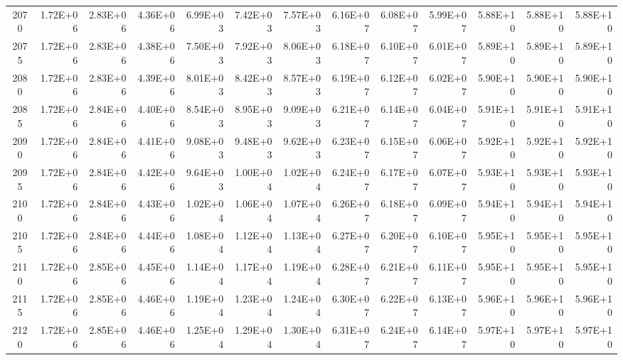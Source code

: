 \documentclass{article}
\begin{document}
\begin{table}
\begin{tabular}{crrr|rrr|rrr|rrr}
2070     & 1.72E+06   & 2.83E+06   & 4.36E+06   & 6.99E+03   & 7.42E+03   & 7.57E+03   & 6.16E+07   & 6.08E+07   & 5.99E+07   & 5.88E+10   & 5.88E+10   & 5.88E+10   \\
2075     & 1.72E+06   & 2.83E+06   & 4.38E+06   & 7.50E+03   & 7.92E+03   & 8.06E+03   & 6.18E+07   & 6.10E+07   & 6.01E+07   & 5.89E+10   & 5.89E+10   & 5.89E+10   \\
2080     & 1.72E+06   & 2.83E+06   & 4.39E+06   & 8.01E+03   & 8.42E+03   & 8.57E+03   & 6.19E+07   & 6.12E+07   & 6.02E+07   & 5.90E+10   & 5.90E+10   & 5.90E+10   \\
2085     & 1.72E+06   & 2.84E+06   & 4.40E+06   & 8.54E+03   & 8.95E+03   & 9.09E+03   & 6.21E+07   & 6.14E+07   & 6.04E+07   & 5.91E+10   & 5.91E+10   & 5.91E+10   \\
2090     & 1.72E+06   & 2.84E+06   & 4.41E+06   & 9.08E+03   & 9.48E+03   & 9.62E+03   & 6.23E+07   & 6.15E+07   & 6.06E+07   & 5.92E+10   & 5.92E+10   & 5.92E+10   \\
2095     & 1.72E+06   & 2.84E+06   & 4.42E+06   & 9.64E+03   & 1.00E+04   & 1.02E+04   & 6.24E+07   & 6.17E+07   & 6.07E+07   & 5.93E+10   & 5.93E+10   & 5.93E+10   \\
2100     & 1.72E+06   & 2.84E+06   & 4.43E+06   & 1.02E+04   & 1.06E+04   & 1.07E+04   & 6.26E+07   & 6.18E+07   & 6.09E+07   & 5.94E+10   & 5.94E+10   & 5.94E+10   \\
2105     & 1.72E+06   & 2.84E+06   & 4.44E+06   & 1.08E+04   & 1.12E+04   & 1.13E+04   & 6.27E+07   & 6.20E+07   & 6.10E+07   & 5.95E+10   & 5.95E+10   & 5.95E+10   \\
2110     & 1.72E+06   & 2.85E+06   & 4.45E+06   & 1.14E+04   & 1.17E+04   & 1.19E+04   & 6.28E+07   & 6.21E+07   & 6.11E+07   & 5.95E+10   & 5.95E+10   & 5.95E+10   \\
2115     & 1.72E+06   & 2.85E+06   & 4.46E+06   & 1.19E+04   & 1.23E+04   & 1.24E+04   & 6.30E+07   & 6.22E+07   & 6.13E+07   & 5.96E+10   & 5.96E+10   & 5.96E+10   \\
2120     & 1.72E+06   & 2.85E+06   & 4.46E+06   & 1.25E+04   & 1.29E+04   & 1.30E+04   & 6.31E+07   & 6.24E+07   & 6.14E+07   & 5.97E+10   & 5.97E+10   & 5.97E+10  
\end{tabular}
\end{table}
\end{document}
